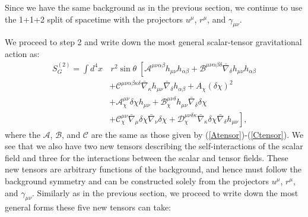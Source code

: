 \documentclass[10pt,twocolumn,preprintnumbers,amsmath,amssymb,nofootinbib
,superscriptaddress]{revtex4-1}
\begin{document}
Since we have the same background as in the previous section, we continue to use the 1+1+2 split of spacetime with the projectors $u^\mu$, $r^\mu$, and $\gamma_{\mu\nu}$. 

We proceed to step 2 and write down the most general scalar-tensor gravitational action as:
\begin{align}
 S_G^{(2)}=\int d^4x&\,r^2\sin\theta\; \left[\mathcal{A}^{\mu\nu\alpha\beta} h_{\mu\nu} h_{\alpha\beta}
 + \mathcal{B}^{\mu\nu\alpha\beta\delta}\bar{\nabla}_{\delta} h_{\mu\nu} h_{\alpha\beta}
\right. \nonumber\\
&\left.+ \mathcal{C}^{\mu\nu\alpha\beta\kappa\delta}\bar{\nabla}_{\kappa} h_{\mu\nu} \bar{\nabla}_{\delta} h_{\alpha\beta} +A_{\chi}(\delta\chi)^2 \right. \nonumber\\
&\left.+\mathcal{A}_\chi^{\mu\nu}\delta\chi h_{\mu\nu}+\mathcal{B}_\chi^{\mu\nu\delta}h_{\mu\nu}\bar{\nabla}_\delta\delta\chi \right. \nonumber\\
&\left.+\mathcal{C}_\chi^{\mu\nu}\bar{\nabla}_\mu\delta\chi\bar{\nabla}_\nu\delta\chi+\mathcal{D}_\chi^{\mu\nu\delta\kappa}\bar{\nabla}_\kappa\delta\chi\bar{\nabla}_\delta h_{\mu\nu}\right], \label{SgenSTBH}
\end{align}
where the $\mathcal{A}$, $\mathcal{B}$, and $\mathcal{C}$ are the same as those given by (\ref{Atensor})-(\ref{Ctensor}). We see that we also have two new tensors describing the self-interactions of the scalar field and three for the interactions between the scalar and tensor fields. These new tensors are arbitrary functions of the background, and hence must follow the background symmetry and can be constructed solely from the projectors $u^\mu$, $r^\mu$, and $\gamma_{\mu\nu}$. Similarly as in the previous section, we proceed to write down the most general forms these five new tensors can take: 
\end{document}

